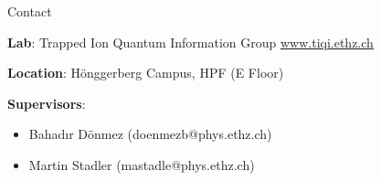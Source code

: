 \documentclass{project-proposal}
\begin{document}
\begin{section}{3cm}{Contact}

 \textbf{Lab}:\newline
 Trapped Ion Quantum Information Group\newline
 \url{www.tiqi.ethz.ch} \newline


 \textbf{Location}:\newline
 Hönggerberg Campus, HPF (E Floor)\newline

 \textbf{Supervisors}:
 \begin{itemize}
     \item {Bahadır Dönmez (doenmezb@phys.ethz.ch)}
     \item {Martin Stadler (mastadle@phys.ethz.ch)}
 \end{itemize}

\end{section}
\end{document}
